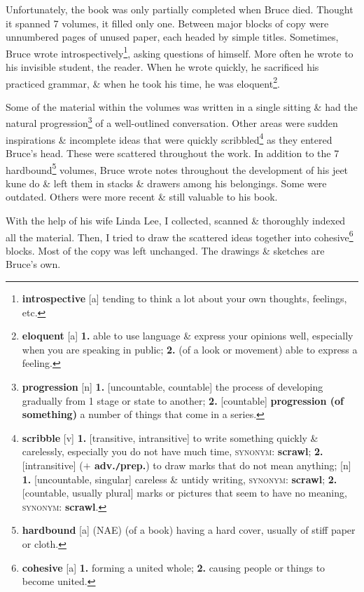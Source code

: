 \documentclass[oneside]{book}
\numberwithin{equation}{section}
\begin{document}
Unfortunately, the book was only partially completed when Bruce died. Thought it spanned 7 volumes, it filled only one. Between major blocks of copy were unnumbered pages of unused paper, each headed by simple titles. Sometimes, Bruce wrote introspectively\footnote{\textbf{introspective} [a] tending to think a lot about your own thoughts, feelings, etc.}, asking questions of himself. More often he wrote to his invisible student, the reader. When he wrote quickly, he sacrificed his practiced grammar, \& when he took his time, he was eloquent\footnote{\textbf{eloquent} [a] \textbf{1.} able to use language \& express your opinions well, especially when you are speaking in public; \textbf{2.} (of a look or movement) able to express a feeling.}.

Some of the material within the volumes was written in a single sitting \& had the natural progression\footnote{\textbf{progression} [n] \textbf{1.} [uncountable, countable] the process of developing gradually from 1 stage or state to another; \textbf{2.} [countable] \textbf{progression (of something)} a number of things that come in a series.} of a well-outlined conversation. Other areas were sudden inspirations \& incomplete ideas that were quickly scribbled\footnote{\textbf{scribble} [v] \textbf{1.} [transitive, intransitive] to write something quickly \& carelessly, especially you do not have much time, \textsc{synonym}: \textbf{scrawl}; \textbf{2.} [intransitive] (\textbf{$+$ adv.\texttt{/}prep.}) to draw marks that do not mean anything; [n] \textbf{1.} [uncountable, singular] careless \& untidy writing, \textsc{synonym}: \textbf{scrawl}; \textbf{2.} [countable, usually plural] marks or pictures that seem to have no meaning, \textsc{synonym}: \textbf{scrawl}.} as they entered Bruce's head. These were scattered throughout the work. In addition to the 7 hardbound\footnote{\textbf{hardbound} [a] (NAE) (of a book) having a hard cover, usually of stiff paper or cloth.} volumes, Bruce wrote notes throughout the development of his jeet kune do \& left them in stacks \& drawers among his belongings. Some were outdated. Others were more recent \& still valuable to his book.

With the help of his wife Linda Lee, I collected, scanned \& thoroughly indexed all the material. Then, I tried to draw the scattered ideas together into cohesive\footnote{\textbf{cohesive} [a] \textbf{1.} forming a united whole; \textbf{2.} causing people or things to become united.} blocks. Most of the copy was left unchanged. The drawings \& sketches are Bruce's own.
\end{document}
